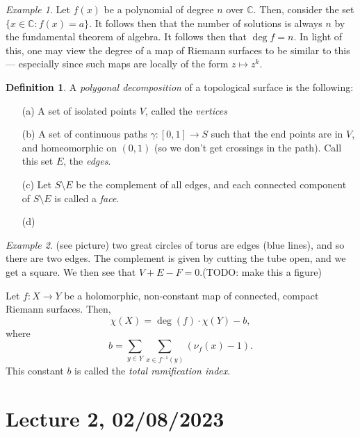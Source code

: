 \documentclass[a4paper]{report}
\theoremstyle{definition}
\newtheorem{definition}{Definition}
\theoremstyle{remark}
\theoremstyle{proposition}
\theoremstyle{conjecture}
\theoremstyle{lemma}
\theoremstyle{corollary}
\theoremstyle{exercise}
\theoremstyle{example}
\newtheorem{example}{Example}
\newcommand{\C}{\mathbb{C}}
\begin{document}
\begin{example}
    Let $f(x)$ be a polynomial of degree $n$ over $\C$.
    Then, consider the set $\lbrace x \in \C : f(x) = a\rbrace$.
    It follows then that the number of solutions is always $n$ 
    by the fundamental theorem of algebra. It follows then that 
    $\deg f = n$. In light of this, one may view the degree of a 
    map of Riemann surfaces to be similar to this --- especially 
    since such maps are locally of the form $z\mapsto z^k$.
\end{example}

\begin{definition}
    A \emph{polygonal decomposition} of a topological surface is the following:
    \begin{itemize}
        \item[(a)] A set of isolated points $V$, called the \emph{vertices}
        \item[(b)] A set of continuous paths $\gamma: [0,1] \to S$ such that 
            the end points are in $V$, and homeomorphic on $(0,1)$ (so we don't get crossings in the path). Call this set $E$, the \emph{edges}.
        \item[(c)] Let $S\setminus E$ be the complement of all edges, and each
            connected component of $S\setminus E$ is called a \emph{face}.
        \item[(d)] 
    \end{itemize}
\end{definition}

\begin{example}
    (see picture) two great circles of torus are edges (blue lines), and
    so there are two edges.
    The complement is given by cutting the tube open, and we get a square.
    We then see that $V+E-F = 0$.(TODO: make this a figure)
\end{example}

\begin{theorem}
    Let $f: X \to Y$ be a holomorphic, non-constant map of connected,
    compact Riemann surfaces. Then, $$\chi(X) = \deg(f) \cdot \chi(Y) - b,$$
    where $$b = \sum_{y \in Y} \sum_{x\in f^{-1}(y)} (\nu_f(x)-1).$$
    This constant $b$ is called the \emph{total ramification index}.
\end{theorem}

\section{Lecture 2, 02/08/2023}
\end{document}
